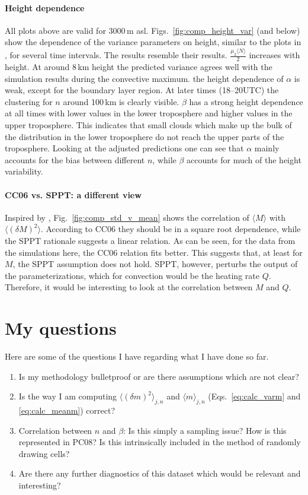 \documentclass[a4paper, 12pt]{article}
\begin{document}
\paragraph{Height dependence} All plots above are valid for 3000\,m asl. Figs.~\ref{fig:comp_height_var} (and below) show the dependence of the variance parameters on height, similar to the plots in \cite{Davoudi2010}, for several time intervals. The results resemble their results. $\frac{\mu_2 \langle N \rangle}{2}$ increases with height. At around 8\,km height the predicted variance agrees well with the simulation results during the convective maximum. the height dependence of $\alpha$ is weak, except for the boundary layer region. At later times (18--20UTC) the clustering for $n$ around 100\,km is clearly visible. $\beta$ has a strong height dependence at all times with lower values in the lower troposphere and higher values in the upper troposphere. This indicates that small clouds which make up the bulk of the distribution in the lower troposphere do not reach the upper parts of the troposphere. Looking at the adjusted predictions one can see that $\alpha$ mainly accounts for the bias between different $n$, while $\beta$ accounts for much of the height variability. 

\paragraph{CC06 vs. SPPT: a different view}
Inspired by \cite{Shutts2007}, Fig.~\ref{fig:comp_std_v_mean} shows the correlation of $\langle M \rangle$ with $\langle (\delta M)^2 \rangle$. According to CC06 they should be in a square root dependence, while the SPPT rationale suggests a linear relation. As can be seen, for the data from the simulations here, the CC06 relation fits better. This suggests that, at least for $M$, the SPPT assumption does not hold. SPPT, however, perturbs the output of the parameterizations, which for convection would be the heating rate $Q$. Therefore, it would be interesting to look at the correlation between $M$ and $Q$. 

\section{My questions}
Here are some of the questions I have regarding what I have done so far.
\begin{enumerate}
 \item Is my methodology bulletproof or are there assumptions which are not clear?
 \item Is the way I am computing $\langle (\delta m )^2 \rangle_{j,n}$ and $\langle m \rangle_{j,n}$ (Eqs.~\ref{eq:calc_varm} and \ref{eq:calc_meanm}) correct? 
 \item Correlation between $n$ and $\beta$: Is this simply a sampling issue? How is this represented in PC08? Is this intrinsically included in the method of randomly drawing cells?
 \item Are there any further diagnostics of this dataset which would be relevant and interesting?
\end{enumerate}
\end{document}
